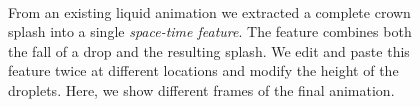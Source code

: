 \documentclass[review]{acmsiggraph}
\begin{document}
\begin{figure}[th!]
    \centering
~
~
                          \caption{From an existing liquid animation we extracted a complete crown splash into a single \emph{space-time feature}. The feature combines both the fall of a drop and the resulting splash. We edit and paste this feature twice at different locations and modify the height of the droplets. Here, we show different frames of the final animation.
                          }
    \label{fig:result_trajectory}
\end{figure}

\end{document}
